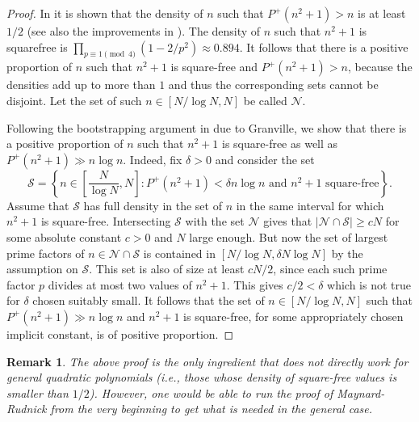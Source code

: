 \documentclass[11pts]{amsart}
\numberwithin{equation}{section}
\newtheorem{rem}{Remark}[section]
\begin{document}
\begin{proof}
    In \cite{maynard2021a} it is shown that the density of $n$ such that $P^+(n^2 + 1)>n$ is at least $1/2$ (see also the improvements in \cite{JTNB_2020__32_3_891_0}). The density of $n$ such that $n^2 + 1$ is squarefree is $\prod_{p\equiv 1\pmod 4} (1-2/p^2)\approx 0.894$. It follows that there is a positive proportion of $n$ such that $n^2 + 1$ is square-free and $P^+(n^2 + 1) > n$, because the densities add up to more than $1$ and thus the corresponding sets cannot be disjoint. Let the set of such $n\in[N/\log N, N]$ be called $\mathcal N$.
   
   Following the bootstrapping argument in \cite{maynard2021a} due to Granville, we show that there is a positive proportion of $n$ such that $n^2 + 1$ is square-free as well as $P^+(n^2 + 1)\gg n\log n$. Indeed, fix $\delta>0$ and consider the set 
   \begin{equation}\mathcal S = \left\{n\in \left[\frac{N}{\log N}, N\right] : P^+(n^2 + 1) < \delta n\log n \text{ and } n^2 + 1 \text{ square-free}\right\}.\end{equation} Assume that $\mathcal S$ has full density in the set of $n$ in the same interval for which $n^2 + 1$ is square-free. Intersecting $\mathcal S$ with the set $\mathcal N$ gives that $\lvert \mathcal N\cap\mathcal S\rvert\geq cN$ for some absolute constant $c>0$ and $N$ large enough. But now the set of largest prime factors of $n\in\mathcal N\cap\mathcal S$ is contained in $[N/\log N, \delta N\log N]$ by the assumption on $\mathcal S$. This set is also of size at least $cN/2$, since each such prime factor $p$ divides at most two values of $n^2 + 1$. This gives $c/2 < \delta$ which is not true for $\delta$ chosen suitably small. It follows that the set of $n\in [N/\log N, N]$ such that $P^+(n^2 + 1)\gg n\log n$ and $n^2 + 1$ is square-free, for some appropriately chosen implicit constant, is of positive proportion.
\end{proof}

\begin{rem}\label{rem_quadr}
    The above proof is the only ingredient that does not directly work for general quadratic polynomials (i.e., those whose density of square-free values is smaller than $1/2$). However, one would be able to run the proof of Maynard-Rudnick \cite{maynard2021a} from the very beginning to get what is needed in the general case. 
\end{rem}
\end{document}
